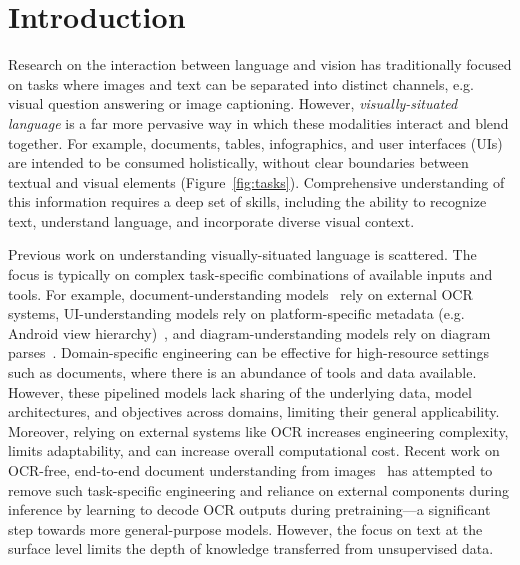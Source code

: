 \documentclass{article} \usepackage[accepted]{icml2023}
\begin{document}
\section{Introduction}
Research on the interaction between language and vision has traditionally focused on tasks where images and text can be separated into distinct channels, e.g. visual question answering or image captioning. However, \emph{visually-situated language} is a far more pervasive way in which these modalities interact and blend together. For example, documents, tables, infographics, and user interfaces (UIs) are intended to be consumed holistically, without clear boundaries between textual and visual elements (Figure~\ref{fig:tasks}). Comprehensive understanding of this information requires a deep set of skills, including the ability to recognize text, understand language, and incorporate diverse visual context.

Previous work on understanding visually-situated language is scattered. The focus is typically on complex task-specific combinations of available inputs and tools. For example, document-understanding models~\citep{layoutlmv3} rely on external OCR systems, UI-understanding models rely on platform-specific metadata (e.g. Android view hierarchy)~\citep{uibert}, and diagram-understanding models rely on diagram parses~\citep{kembhavi2016diagram}. Domain-specific engineering can be effective for high-resource settings such as documents, where there is an abundance of tools and data available. However, these pipelined models lack sharing of the underlying data, model architectures, and objectives across domains, limiting their general applicability. Moreover, relying on external systems like OCR increases engineering complexity, limits adaptability, and can increase overall computational cost. Recent work on OCR-free, end-to-end document understanding from images~\citep{donut, dessurt} has attempted to remove such task-specific engineering and reliance on external components during inference by learning to decode OCR outputs during pretraining---a significant step towards more general-purpose models. However, the focus on text at the surface level limits the depth of knowledge transferred from unsupervised data. 
\end{document}
